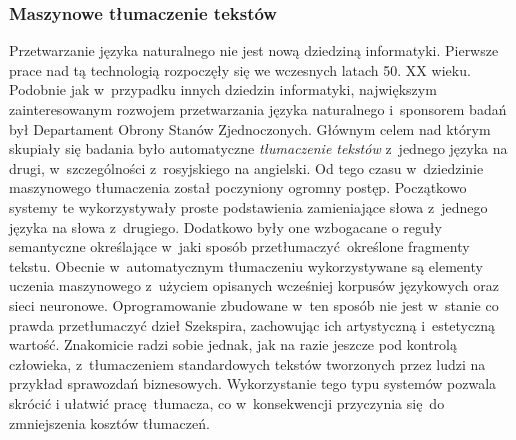\documentclass[a4paper, twoside, 12pt]{report}
\begin{document}
            \subsubsection{Maszynowe tłumaczenie tekstów}
                Przetwarzanie języka naturalnego nie jest nową dziedziną informatyki. Pierwsze prace nad tą technologią
                rozpoczęły się we wczesnych latach 50. XX wieku. Podobnie jak w~przypadku innych dziedzin informatyki,
                największym zainteresowanym rozwojem przetwarzania języka naturalnego i~sponsorem badań był Departament
                Obrony Stanów Zjednoczonych. Głównym celem nad którym skupiały się badania było automatyczne
                \emph{tłumaczenie tekstów} z~jednego języka na drugi, w~szczególności z~rosyjskiego na
                angielski\cite{NLPHISTORY}. Od tego czasu w~dziedzinie maszynowego tłumaczenia został poczyniony
                ogromny postęp. Początkowo systemy te wykorzystywały proste podstawienia zamieniające słowa z~jednego
                języka na słowa z~drugiego. Dodatkowo były one wzbogacane o reguły semantyczne określające w~jaki
                sposób przetłumaczyć określone fragmenty tekstu.  Obecnie w~automatycznym tłumaczeniu wykorzystywane
                są elementy uczenia maszynowego z~użyciem opisanych wcześniej korpusów językowych oraz sieci neuronowe.
                Oprogramowanie zbudowane w~ten sposób nie jest w~stanie co prawda przetłumaczyć dzieł Szekspira,
                zachowując ich artystyczną i~estetyczną wartość. Znakomicie radzi sobie jednak, jak na razie jeszcze
                pod kontrolą człowieka, z~tłumaczeniem standardowych tekstów tworzonych przez ludzi na przykład
                sprawozdań biznesowych\cite{INTROTOMACHINETRANSLATION}. Wykorzystanie tego typu systemów pozwala skrócić i
                ułatwić pracę tłumacza, co w~konsekwencji przyczynia się do zmniejszenia kosztów tłumaczeń.
\end{document}
